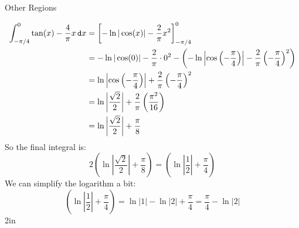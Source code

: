 \begin{exercise}{Other Regions \Coffeecup \Coffeecup}
\begin{itemize}
{\begin{align*}
\int_{-\pi/4}^0\tan(x)-\frac{4}{\pi}x\mathop{}\!\mathtt{d} x&=\left[-\ln|\cos(x)|-\frac{2}{\pi}x^2\right]_{-\pi/4}^0\\
&=-\ln|\cos(0)|-\frac{2}{\pi}\cdot0^2-\left(-\ln\left|\cos\left(-\frac{\pi}{4}\right)\right|-\frac{2}{\pi}\left(-\frac{\pi}{4}\right)^2\right)\\
&=\ln\left|\cos\left(-\frac{\pi}{4}\right)\right|+\frac{2}{\pi}\left(-\frac{\pi}{4}\right)^2\\
&=\ln\left|\frac{\sqrt{2}}{2}\right|+\frac{2}{\pi}\left(\frac{\pi^2}{16}\right)\\
&=\ln\left|\frac{\sqrt{2}}{2}\right|+\frac{\pi}{8}
\end{align*}
So the final integral is:
$$2\left(\ln\left|\frac{\sqrt{2}}{2}\right|+\frac{\pi}{8}\right)=\left(\ln\left|\frac{1}{2}\right|+\frac{\pi}{4}\right)$$
We can simplify the logarithm a bit:
$$\left(\ln\left|\frac{1}{2}\right|+\frac{\pi}{4}\right)=\ln|1|-\ln|2|+\frac{\pi}{4}=\frac{\pi}{4}-\ln|2|$$
}{2in}

\end{itemize}
\end{exercise}